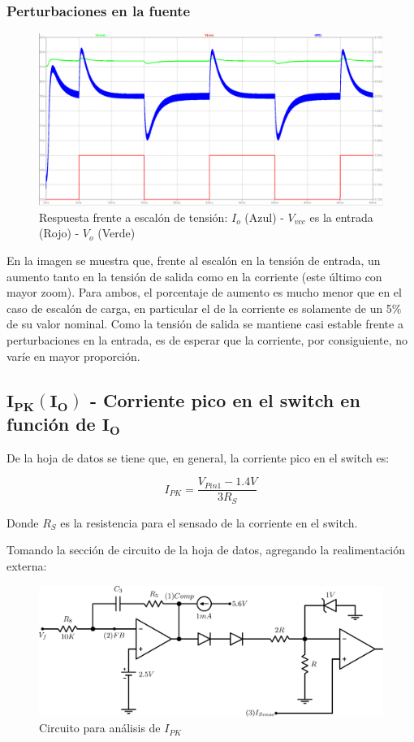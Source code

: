 \documentclass[e4_tp2_main.tex]{subfiles}
\begin{document}
\subsubsection*{Perturbaciones en la fuente}
\begin{figure}[H]
\centering
\includegraphics[width=0.8\linewidth]{Imagenes/Punto2/fuentevariable-I-V.PNG}
\caption{Respuesta frente a escalón de tensión: $I_o$ (Azul) - $V_{vcc}$ es la entrada (Rojo) - $V_o$ (Verde)}
\end{figure}

En la imagen se muestra que, frente al escalón en la tensión de entrada, un aumento tanto en la tensión de salida como en la corriente (este último con mayor zoom). Para ambos, el porcentaje de aumento es mucho menor que en el caso de escalón de carga, en particular el de la corriente es solamente de un 5\% de su valor nominal. Como la tensión de salida se mantiene casi estable frente a perturbaciones en la entrada, es de esperar que la corriente, por consiguiente, no varíe en mayor proporción.

\subsection*{$\mathbf{I_{PK}(I_O)}$ - Corriente pico en el switch en función de $\mathbf{I_O}$}
De la hoja de datos se tiene que, en general, la corriente pico en el switch es:

\[
I_{PK} = \frac{V_{Pin1} - 1.4V}{3R_S}
\]

Donde $R_S$ es la resistencia para el sensado de la corriente en el switch.

Tomando la sección de circuito de la hoja de datos, agregando la realimentación externa:

\begin{figure}[H]
\centering
\includegraphics[width=0.8\linewidth]{Imagenes/Punto2/IPK-Circuito.png}
\caption{Circuito para análisis de $I_{PK}$}
\end{figure}
\end{document}
